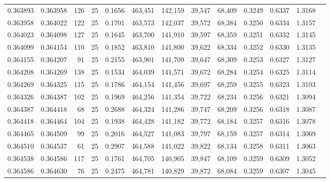\begin{tabular}{rrrrrrrrrrrrr}
0.363893 & 0.363958 &   126 &  25 &                                     0.1656 & 463,451 & 142,159 &  39,547 &  68,409 & 0.3249 & 0.6337 & 1.3168 \\
0.363958 & 0.364022 &   122 &  25 &                                     0.1701 & 463,573 & 142,037 &  39,572 &  68,384 & 0.3250 & 0.6334 & 1.3157 \\
0.364023 & 0.364098 &   127 &  25 &                                     0.1645 & 463,700 & 141,910 &  39,597 &  68,359 & 0.3251 & 0.6332 & 1.3145 \\
0.364099 & 0.364154 &   110 &  25 &                                     0.1852 & 463,810 & 141,800 &  39,622 &  68,334 & 0.3252 & 0.6330 & 1.3135 \\
0.364155 & 0.364207 &    91 &  25 &                                     0.2155 & 463,901 & 141,709 &  39,647 &  68,309 & 0.3253 & 0.6327 & 1.3127 \\
0.364208 & 0.364269 &   138 &  25 &                                     0.1534 & 464,039 & 141,571 &  39,672 &  68,284 & 0.3254 & 0.6325 & 1.3114 \\
0.364269 & 0.364325 &   115 &  25 &                                     0.1786 & 464,154 & 141,456 &  39,697 &  68,259 & 0.3255 & 0.6323 & 1.3103 \\
0.364326 & 0.364387 &   102 &  25 &                                     0.1969 & 464,256 & 141,354 &  39,722 &  68,234 & 0.3256 & 0.6321 & 1.3094 \\
0.364387 & 0.364418 &    68 &  25 &                                     0.2688 & 464,324 & 141,286 &  39,747 &  68,209 & 0.3256 & 0.6318 & 1.3087 \\
0.364418 & 0.364464 &   104 &  25 &                                     0.1938 & 464,428 & 141,182 &  39,772 &  68,184 & 0.3257 & 0.6316 & 1.3078 \\
0.364465 & 0.364509 &    99 &  25 &                                     0.2016 & 464,527 & 141,083 &  39,797 &  68,159 & 0.3257 & 0.6314 & 1.3069 \\
0.364510 & 0.364537 &    61 &  25 &                                     0.2907 & 464,588 & 141,022 &  39,822 &  68,134 & 0.3258 & 0.6311 & 1.3063 \\
0.364538 & 0.364586 &   117 &  25 &                                     0.1761 & 464,705 & 140,905 &  39,847 &  68,109 & 0.3259 & 0.6309 & 1.3052 \\
0.364586 & 0.364630 &    76 &  25 &                                     0.2475 & 464,781 & 140,829 &  39,872 &  68,084 & 0.3259 & 0.6307 & 1.3045 \\

\end{tabular}
